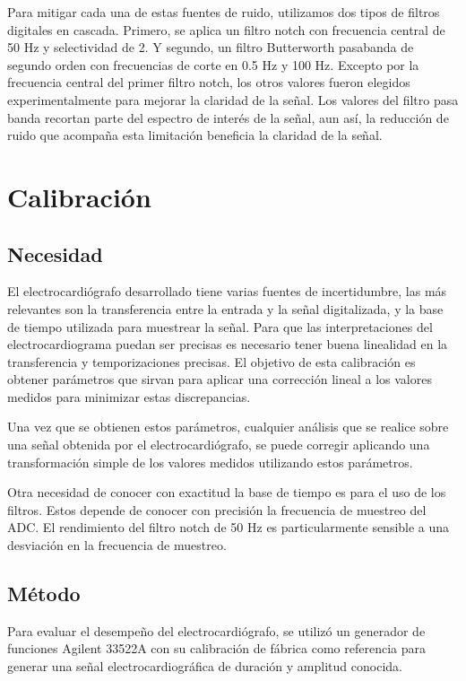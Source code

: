\documentclass[conference]{IEEEtran}
\begin{document}
Para mitigar cada una de estas fuentes de ruido, utilizamos dos tipos de filtros
digitales en cascada. Primero, se aplica un filtro notch con frecuencia central
de 50 Hz y selectividad de 2. Y segundo, un filtro Butterworth pasabanda de
segundo orden con frecuencias de corte en 0.5 Hz y 100 Hz. Excepto por la
frecuencia central del primer filtro notch, los otros valores fueron elegidos
experimentalmente para mejorar la claridad de la señal. Los valores del filtro
pasa banda recortan parte del espectro de interés de la señal, aun así, la
reducción de ruido que acompaña esta limitación beneficia la claridad de la
señal.


\section{Calibración}


\subsection{Necesidad}

El electrocardiógrafo desarrollado tiene varias fuentes de incertidumbre, las
más relevantes son la transferencia entre la entrada y la señal digitalizada, y
la base de tiempo utilizada para muestrear la señal. Para que las
interpretaciones del electrocardiograma puedan ser precisas es necesario tener
buena linealidad en la transferencia y temporizaciones precisas. El objetivo de
esta calibración es obtener parámetros que sirvan para aplicar una corrección
lineal a los valores medidos para minimizar estas discrepancias.

Una vez que se obtienen estos parámetros, cualquier análisis que se realice
sobre una señal obtenida por el electrocardiógrafo, se puede corregir aplicando
una transformación simple de los valores medidos utilizando estos parámetros.

Otra necesidad de conocer con exactitud la base de tiempo es para el uso de los
filtros. Estos depende de conocer con precisión la frecuencia de muestreo del
ADC. El rendimiento del filtro notch de 50 Hz es particularmente sensible a una
desviación en la frecuencia de muestreo.


\subsection{Método}


Para evaluar el desempeño del electrocardiógrafo, se utilizó un generador de
funciones Agilent 33522A con su calibración de fábrica como referencia para
generar una señal electrocardiográfica de duración y amplitud conocida.
\end{document}
